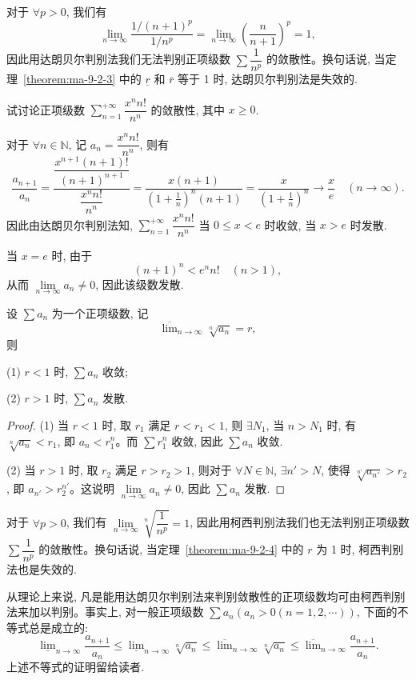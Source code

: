 对于 $\forall p>0$, 我们有
\[
  \lim_{n\to\infty}\frac{1/(n+1)^p}{1/n^p}
  =\lim_{n\to\infty}\left(\frac{n}{n+1}\right)^p=1,
\]
因此用达朗贝尔判别法我们无法判别正项级数 $\sum\dfrac1{n^p}$ 的敛散性。换句话说, 当定理~\ref{theorem:ma-9-2-3} 中的 $\underline r$ 和 $\bar r$ 等于 1 时, 达朗贝尔判别法是失效的.

\begin{example}\label{example:ma-9-2-6}
试讨论正项级数 $\sum\limits_{n=1}^{+\infty}\dfrac{x^n n!}{n^n}$ 的敛散性, 其中 $x\geq0$.
\end{example}


\begin{solve}
对于 $\forall n\in\mathbb{N}$, 记 $a_n=\dfrac{x^n n!}{n^n}$, 则有
\[
  \frac{a_{n+1}}{a_n}
  =\frac{\dfrac{x^{n+1}(n+1)!}{(n+1)^{n+1}}}{\dfrac{x^n n!}{n^n}}
  =\frac{x(n+1)}{\left(1+\frac1n\right)^n(n+1)}
  =\frac{x}{\left(1+\frac1n\right)^n}\to\frac{x}{e}\quad(n\to\infty).
\]
因此由达朗贝尔判别法知, $\sum\limits_{n=1}^{+\infty}\dfrac{x^n n!}{n^n}$ 当 $0\leq x<e$ 时收敛, 当 $x>e$ 时发散.

当 $x=e$ 时, 由于
\[
  (n+1)^n<e^n n!\quad(n>1),
\]
从而 $\lim\limits_{n\to\infty}a_n\neq0$, 因此该级数发散.
\end{solve}


\begin{theorem}[{柯西判别法}]\label{theorem:ma-9-2-4}
设 $\sum a_n$ 为一个正项级数, 记
\[
  \overline{\lim}_{n\to\infty}\sqrt[n]{a_n}=r,
\]
则

(1) $r<1$ 时, $\sum a_n$ 收敛;

(2) $r>1$ 时, $\sum a_n$ 发散.
\end{theorem}


\begin{proof}
(1) 当 $r<1$ 时, 取 $r_1$ 满足 $r<r_1<1$, 则 $\exists N_1$, 当 $n>N_1$ 时, 有 $\sqrt[n]{a_n}<r_1$, 即 $a_n<r_1^n$。而 $\sum r_1^n$ 收敛, 因此 $\sum a_n$ 收敛.

(2) 当 $r>1$ 时, 取 $r_2$ 满足 $r>r_2>1$, 则对于 $\forall N\in\mathbb{N}$, $\exists n'>N$, 使得 $\sqrt[n']{a_{n'}}>r_2$, 即 $a_{n'}>r_2^{n'}$。这说明 $\lim\limits_{n\to\infty}a_n\neq0$, 因此 $\sum a_n$ 发散.
\end{proof}


对于 $\forall p>0$, 我们有 $\lim\limits_{n\to\infty}\sqrt[n]{\dfrac1{n^p}}=1$, 因此用柯西判别法我们也无法判别正项级数 $\sum\dfrac1{n^p}$ 的敛散性。换句话说, 当定理~\ref{theorem:ma-9-2-4} 中的 $r$ 为 1 时, 柯西判别法也是失效的.

从理论上来说, 凡是能用达朗贝尔判别法来判别敛散性的正项级数均可由柯西判别法来加以判别。事实上, 对一般正项级数 $\sum a_n(a_n>0(n=1,2,\cdots))$, 下面的不等式总是成立的:
\[
  \underline{\lim}_{n\to\infty}\frac{a_{n+1}}{a_n}
  \leq \underline{\lim}_{n\to\infty}\sqrt[n]{a_n}
  \leq \overline{\lim}_{n\to\infty}\sqrt[n]{a_n}
  \leq \overline{\lim}_{n\to\infty}\frac{a_{n+1}}{a_n}.
\]
上述不等式的证明留给读者.

